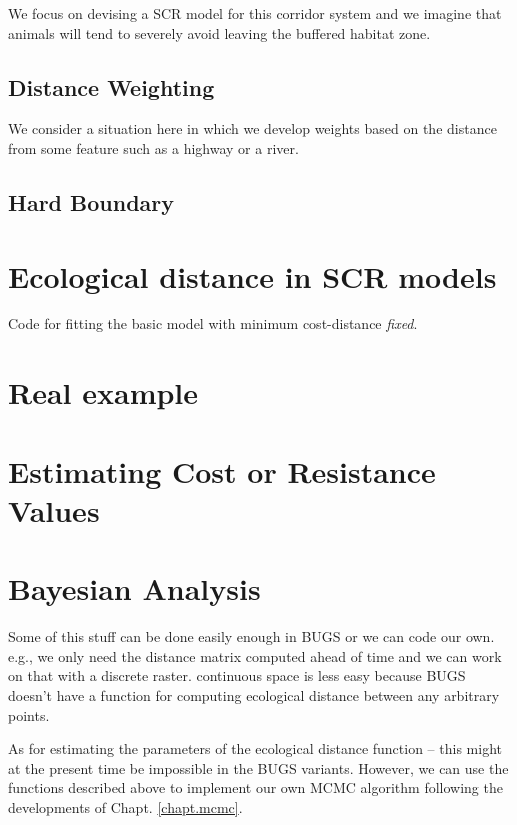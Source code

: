 We focus on devising a SCR model for this corridor system and we
imagine that animals will tend to severely avoid leaving the buffered
habitat zone.

\subsection{Distance Weighting}

We consider a situation here in which we develop weights based on the
distance from some feature such as a highway or a river. 

\subsection{Hard Boundary}

\section{Ecological distance in SCR models}

Code for fitting the basic model  with minimum cost-distance {\it fixed}.



\section{Real example}


\section{Estimating Cost or Resistance Values}

\section{Bayesian Analysis}

Some of this stuff can be done easily enough in BUGS or we can code
our own. e.g., we only need the distance matrix computed ahead of time
and we can work on that with a discrete raster.  continuous space is
less easy because BUGS doesn't have a function for computing
ecological distance between any arbitrary points. 

As for estimating the parameters of the ecological distance function
-- this might at the present time be impossible in the BUGS
variants. However, we can use the functions described above to
implement our own MCMC algorithm following the developments of
Chapt. \ref{chapt.mcmc}.


